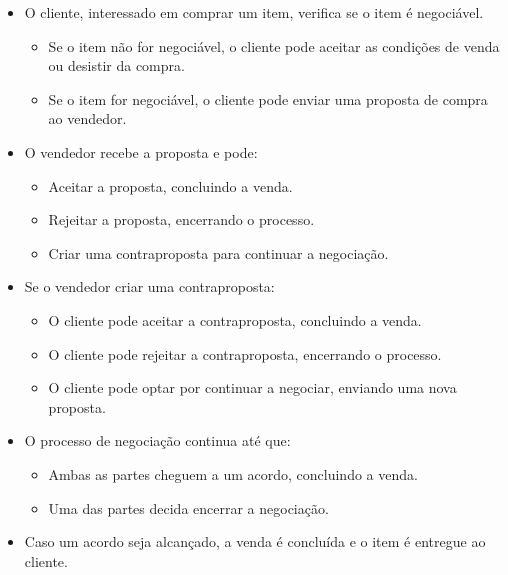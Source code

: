 \documentclass[a4paper, 12pt]{article} %
\begin{document}
\begin{itemize}
	\item O cliente, interessado em comprar um item, verifica se o item é negociável.
	\begin{itemize}
		\item Se o item não for negociável, o cliente pode aceitar as condições de venda ou desistir da compra.
		\item Se o item for negociável, o cliente pode enviar uma proposta de compra ao vendedor.
	\end{itemize}
	\item O vendedor recebe a proposta e pode:
	\begin{itemize}
		\item Aceitar a proposta, concluindo a venda.
		\item Rejeitar a proposta, encerrando o processo.
		\item Criar uma contraproposta para continuar a negociação.
	\end{itemize}
	\item Se o vendedor criar uma contraproposta:
	\begin{itemize}
		\item O cliente pode aceitar a contraproposta, concluindo a venda.
		\item O cliente pode rejeitar a contraproposta, encerrando o processo.
		\item O cliente pode optar por continuar a negociar, enviando uma nova proposta.
	\end{itemize}
	\item O processo de negociação continua até que:
	\begin{itemize}
		\item Ambas as partes cheguem a um acordo, concluindo a venda.
		\item Uma das partes decida encerrar a negociação.
	\end{itemize}
	\item Caso um acordo seja alcançado, a venda é concluída e o item é entregue ao cliente.
\end{itemize}
\end{document}
